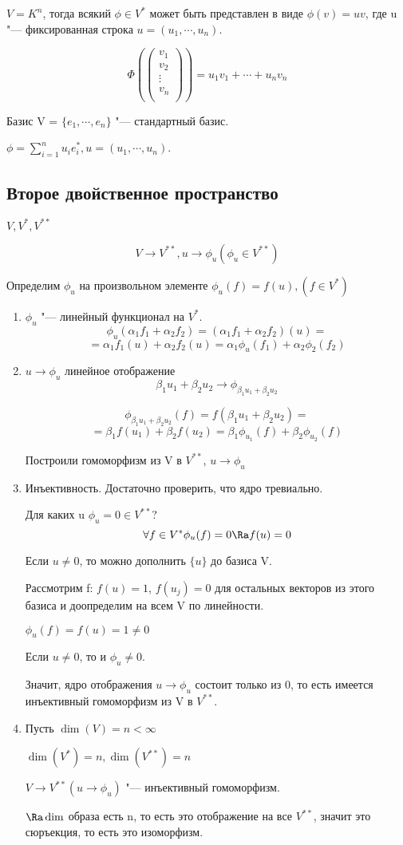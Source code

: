 \begin{Rem}
$V = K^n$, тогда всякий $\phi \in V^{*}$ 
может быть представлен в виде $\phi(v) = uv$, где 
u "--- фиксированная строка $u = (u_1, \cdots, u_n)$.

$$
\Phi(\begin{pmatrix}
v_1\\
v_2\\
\vdots\\
v_n\\
\end{pmatrix}) = u_1v_1 + \cdots + u_nv_n
$$

Базис V = $\{e_1, \cdots, e_n\}$ "--- стандартный базис.

$\phi = \sum_{i = 1}^{n}u_ie_i^{*}, u = (u_1, \cdots, u_n)$.
\end{Rem}

\subsection{Второе двойственное пространство}
$V, V^*, V^{**}$

$$V \to V^{**}, u \to \phi_u (\phi_u \in V^{**})$$

Определим $\phi_u$ на произвольном элементе $\phi_u(f) = f(u), (f \in V^*)$

\begin{enumerate}
\item $\phi_u$ "--- линейный функционал на $V^*$.
$$\phi_u(\alpha_1f_1 + \alpha_2f_2) = (\alpha_1f_1 + \alpha_2f_2)(u) = $$
$$= \alpha_1f_1(u) + \alpha_2f_2(u) = \alpha_1\phi_u(f_1) + \alpha_2\phi_2(f_2)$$
\item $u \to \phi_u$ линейное отображение
$$\beta_1u_1 + \beta_2u_2 \to \phi_{\beta_1u_1 + \beta_2u_2}$$

$$\phi_{\beta_1u_1 + \beta_2u_2}(f) = f(\beta_1u_1 + \beta_2u_2) = $$
$$= \beta_1f(u_1) + \beta_2f(u_2) = \beta_1 \phi_{u_1}(f) + \beta_2\phi_{u_2}(f)$$

Построили гомоморфизм из V  в $V^{**}$, $u \to \phi_u$
\item Инъективность. Достаточно проверить, что ядро тревиально. 

Для каких u $\phi_u = 0 \in V^{**}$?
$$\forall f \in V^* \phi_u(f) = 0 \Ra f(u) = 0 $$

Если $u \ne 0$, то можно дополнить $\{u\}$ до базиса V.

Рассмотрим f: $f(u) = 1$, $f(u_j) = 0$ для остальных
векторов из этого базиса и доопределим на всем V по линейности.

$\phi_u(f) = f(u) = 1 \ne 0$

Если $u \ne 0$, то и $\phi_u \ne 0$.

Значит, ядро отображения $u \to \phi_u$ состоит только из 0, 
то есть имеется инъективный гомоморфизм из V в $V^{**}$.
\item Пусть $\dim(V) = n < \infty$

$\dim(V^{*}) = n, \dim(V^{**}) = n$

$V \to V^{**}(u \to \phi_u)$ "--- инъективный гомоморфизм.

$\Ra \dim$ образа есть n,  то есть это отображение на все $V^{**}$,
значит это сюръекция, то есть это изоморфизм.  
\end{enumerate}

